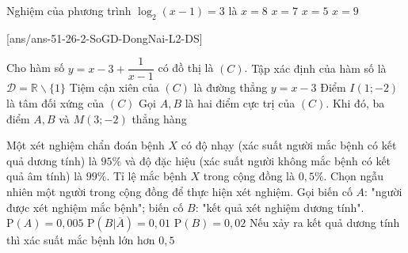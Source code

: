 \begin{ex}%
	Nghiệm của phương trình $\log_{2}(x-1)=3$ là
	\choice
	{$x=8$}
	{$x=7$}
	{$x=5$}
	{\True $x=9$}
\end{ex}

\cauds
{}[ans/ans-51-26-2-SoGD-DongNai-L2-DS]
\begin{ex}%
	Cho hàm số $y=x-3+\dfrac{1}{x-1}$ có đồ thị là $(C)$.
	\choiceTF
	{\True Tập xác định của hàm số là $\mathscr{D}=\mathbb{R}\backslash\{1\}$}
	{\True Tiệm cận xiên của $(C)$ là đường thẳng $y=x-3$}
	{\True Điểm $I(1;-2)$ là tâm đối xứng của $(C)$}
	{Gọi $A, B$ là hai điểm cực trị của $(C)$. Khi đó, ba điểm $A, B$ và $M(3;-2)$ thẳng hàng}
\end{ex}

\begin{ex}%
	Một xét nghiệm chẩn đoán bệnh $X$ có độ nhạy (xác suất người mắc bệnh có kết quả dương tính) là $95\%$ và độ đặc hiệu (xác suất người không mắc bệnh có kết quả âm tính) là $99\%$. Tỉ lệ mắc bệnh $X$ trong cộng đồng là $0{,}5\%$. Chọn ngẫu nhiên một người trong cộng đồng để thực hiện xét nghiệm. Gọi biến cố $A$: "người được xét nghiệm mắc bệnh"; biến cố $B$: "kết quả xét nghiệm dương tính".
	\choiceTF
	{\True $\mathrm{P}(A)=0{,}005$}
	{\True $\mathrm{P}(B|\overline{A})=0{,}01$}
	{$\mathrm{P}(B)=0{,}02$}
	{Nếu xảy ra kết quả dương tính thì xác suất mắc bệnh lớn hơn $0{,}5$}
\end{ex}


